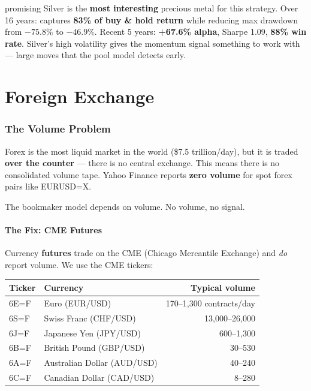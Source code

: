 \documentclass[11pt,a4paper]{article}
\begin{document}
\begin{resultbox}{promising}
Silver is the \textbf{most interesting} precious metal for this
strategy. Over 16 years: captures \textbf{83\% of buy \& hold return}
while reducing max drawdown from $-75.8\%$ to $-46.9\%$. Recent
5 years: \textbf{+67.6\% alpha}, Sharpe 1.09, \textbf{88\% win rate}.
Silver's high volatility gives the momentum signal something to work
with --- large moves that the pool model detects early.
\end{resultbox}

\newpage


\part{Foreign Exchange}

\section{The Volume Problem}

Forex is the most liquid market in the world (\$7.5 trillion/day),
but it is traded \textbf{over the counter} --- there is no central
exchange. This means there is no consolidated volume tape. Yahoo
Finance reports \textbf{zero volume} for spot forex pairs like
EURUSD=X.

The bookmaker model depends on volume. No volume, no signal.

\subsection{The Fix: CME Futures}

Currency \textbf{futures} trade on the CME (Chicago Mercantile
Exchange) and \emph{do} report volume. We use the CME tickers:

\vspace{0.5em}
\begin{tabular}{@{}llr@{}}
    \toprule
    \textbf{Ticker} & \textbf{Currency} & \textbf{Typical volume} \\
    \midrule
    6E=F & Euro (EUR/USD)          & 170--1,300 contracts/day \\
    6S=F & Swiss Franc (CHF/USD)   & 13,000--26,000 \\
    6J=F & Japanese Yen (JPY/USD)  & 600--1,300 \\
    6B=F & British Pound (GBP/USD) & 30--530 \\
    6A=F & Australian Dollar (AUD/USD) & 40--240 \\
    6C=F & Canadian Dollar (CAD/USD)   & 8--280 \\
    \bottomrule
\end{tabular}
\end{document}
